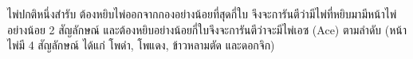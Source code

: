 ﻿%
\question ไพ่ปกติหนึ่งสำรับ ต้องหยิบไพ่ออกจากกองอย่างน้อยที่สุดกี่ใบ จึงจะการันตีว่ามีไพ่ที่หยิบมามีหน้าไพ่อย่างน้อย 2 สัญลักษณ์ และต้องหยิบอย่างน้อยกี่ใบจึงจะการันตีว่าจะมีไพ่เอซ (Ace) ตามลำดับ \newline
(หน้าไพ่มี 4 สัญลักษณ์ ได้แก่ โพดำ, โพแดง, ข้าวหลามตัด และดอกจิก)
\newline
{}
